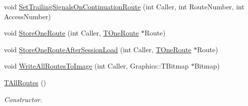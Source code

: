 \begin{DoxyCompactItemize}
\item 
void \mbox{\hyperlink{class_t_all_routes_a18177a40331bb96bbec791245b541f47}{Set\+Trailing\+Signals\+On\+Continuation\+Route}} (int Caller, int Route\+Number, int Access\+Number)
\item 
void \mbox{\hyperlink{class_t_all_routes_af70c07d73f0b62ed85bbebc5451d009c}{Store\+One\+Route}} (int Caller, \mbox{\hyperlink{class_t_one_route}{T\+One\+Route}} $\ast$Route)
\item 
void \mbox{\hyperlink{class_t_all_routes_a7bf52152ec8f71a9aa78ad4dc4f80c65}{Store\+One\+Route\+After\+Session\+Load}} (int Caller, \mbox{\hyperlink{class_t_one_route}{T\+One\+Route}} $\ast$Route)
\item 
void \mbox{\hyperlink{class_t_all_routes_a7c9ca14ec6116983b505f0a451dd078f}{Write\+All\+Routes\+To\+Image}} (int Caller, Graphics\+::\+T\+Bitmap $\ast$Bitmap)
\item 
\mbox{\label{class_t_all_routes_ad562b9a2301042e109db1a895235e36f}} 
\mbox{\hyperlink{class_t_all_routes_ad562b9a2301042e109db1a895235e36f}{T\+All\+Routes}} ()
\begin{DoxyCompactList}\small\item\em Constructor. \end{DoxyCompactList}\end{DoxyCompactItemize}
